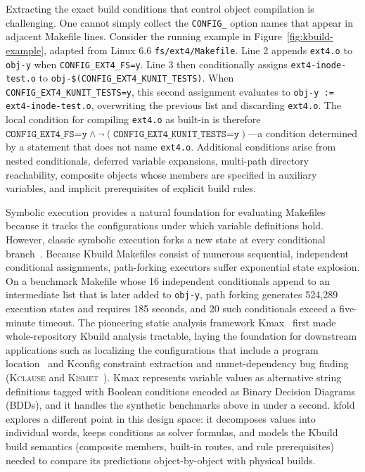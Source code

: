 \documentclass[acmsmall]{acmart}
\newcommand{\tool}{\textsf{kfold}\xspace}
\newcommand{\kmax}{\textsf{Kmax}\xspace}
\begin{document}
Extracting the exact build conditions that control object compilation is challenging.
One cannot simply collect the \texttt{CONFIG\_} option names that appear in adjacent Makefile lines.
Consider the running example in Figure~\ref{fig:kbuild-example}, adapted from Linux 6.6 \texttt{fs/ext4/Makefile}.
Line 2 appends \texttt{ext4.o} to \texttt{obj-y} when \texttt{CONFIG\_EXT4\_FS=y}.
Line 3 then conditionally assigns \texttt{ext4-inode-test.o} to \texttt{obj-\$(CONFIG\_EXT4\_KUNIT\_TESTS)}.
When \texttt{CONFIG\_EXT4\_KUNIT\_TESTS=y}, this second assignment evaluates to \texttt{obj-y := ext4-inode-test.o}, overwriting the previous list and discarding \texttt{ext4.o}.
The local condition for compiling \texttt{ext4.o} as built-in is therefore $\texttt{CONFIG\_EXT4\_FS=y} \land \neg(\texttt{CONFIG\_EXT4\_KUNIT\_TESTS=y})$---a condition determined by a statement that does not name \texttt{ext4.o}.
Additional conditions arise from nested conditionals, deferred variable expansions, multi-path directory reachability, composite objects whose members are specified in auxiliary variables, and implicit prerequisites of explicit build rules.

Symbolic execution provides a natural foundation for evaluating Makefiles because it tracks the configurations under which variable definitions hold.
However, classic symbolic execution forks a new state at every conditional branch~\cite{king1976symbolic,clarke1976program,cadar2008klee,godefroid2005dart,sen2005cute,nguyen2020using}.
Because Kbuild Makefiles consist of numerous sequential, independent conditional assignments, path-forking executors suffer exponential state explosion.
On a benchmark Makefile whose 16 independent conditionals append to an intermediate list that is later added to \texttt{obj-y}, path forking generates 524,289 execution states and requires 185 seconds, and 20 such conditionals exceed a five-minute timeout.
The pioneering static analysis framework \kmax~\cite{gazzillo2017kmax} first made whole-repository Kbuild analysis tractable, laying the foundation for downstream applications such as localizing the configurations that include a program location~\cite{gazzillo2018localizing} and Kconfig constraint extraction and unmet-dependency bug finding (\textsc{Kclause} and \textsc{Kismet}~\cite{oh2021kclause}).
\kmax represents variable values as alternative string definitions tagged with Boolean conditions encoded as Binary Decision Diagrams (BDDs), and it handles the synthetic benchmarks above in under a second.
\tool explores a different point in this design space: it decomposes values into individual words, keeps conditions as solver formulas, and models the Kbuild build semantics (composite members, built-in routes, and rule prerequisites) needed to compare its predictions object-by-object with physical builds.
\end{document}
